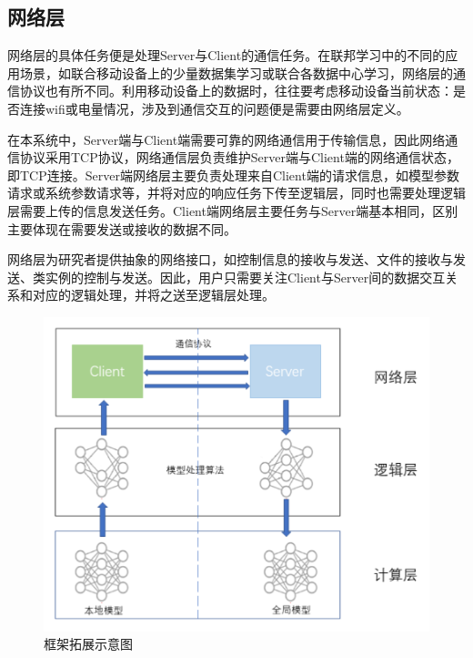 \documentclass[zihao = -4,cn]{oucart}
\begin{document}
\subsection{网络层}
网络层的具体任务便是处理Server与Client的通信任务。在联邦学习中的不同的应用场景，如联合移动设备上的少量数据集学习或联合各数据中心学习，网络层的通信协议也有所不同。利用移动设备上的数据时，往往要考虑移动设备当前状态：是否连接wifi或电量情况，涉及到通信交互的问题便是需要由网络层定义。\par
在本系统中，Server端与Client端需要可靠的网络通信用于传输信息，因此网络通信协议采用TCP协议，网络通信层负责维护Server端与Client端的网络通信状态，即TCP连接。Server端网络层主要负责处理来自Client端的请求信息，如模型参数请求或系统参数请求等，并将对应的响应任务下传至逻辑层，同时也需要处理逻辑层需要上传的信息发送任务。Client端网络层主要任务与Server端基本相同，区别主要体现在需要发送或接收的数据不同。\par
网络层为研究者提供抽象的网络接口，如控制信息的接收与发送、文件的接收与发送、类实例的控制与发送。因此，用户只需要关注Client与Server间的数据交互关系和对应的逻辑处理，并将之送至逻辑层处理。\par

\begin{figure}[h]
	\centering %
	\includegraphics[scale=0.4]{assets/process2}
	\caption{框架拓展示意图}
	\label{fig:frame}
\end{figure}
\end{document}
